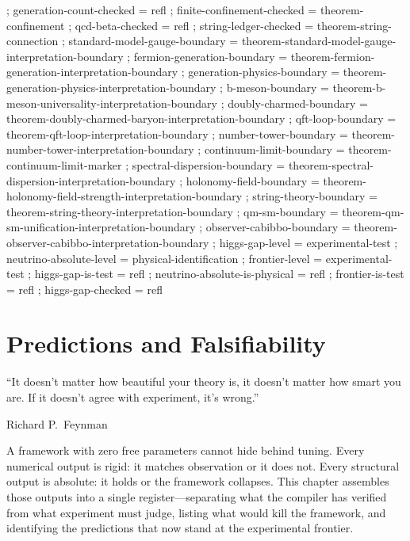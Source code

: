 \documentclass[11pt,a4paper]{book}
\begin{document}
\begin{code}
{  ; generation-count-checked   = refl
  ; finite-confinement-checked = theorem-confinement
  ; qcd-beta-checked           = refl
  ; string-ledger-checked      = theorem-string-connection
  ; standard-model-gauge-boundary = theorem-standard-model-gauge-interpretation-boundary
  ; fermion-generation-boundary = theorem-fermion-generation-interpretation-boundary
  ; generation-physics-boundary = theorem-generation-physics-interpretation-boundary
  ; b-meson-boundary            = theorem-b-meson-universality-interpretation-boundary
  ; doubly-charmed-boundary     = theorem-doubly-charmed-baryon-interpretation-boundary
  ; qft-loop-boundary           = theorem-qft-loop-interpretation-boundary
  ; number-tower-boundary       = theorem-number-tower-interpretation-boundary
  ; continuum-limit-boundary    = theorem-continuum-limit-marker
  ; spectral-dispersion-boundary = theorem-spectral-dispersion-interpretation-boundary
  ; holonomy-field-boundary     = theorem-holonomy-field-strength-interpretation-boundary
  ; string-theory-boundary      = theorem-string-theory-interpretation-boundary
  ; qm-sm-boundary              = theorem-qm-sm-unification-interpretation-boundary
  ; observer-cabibbo-boundary   = theorem-observer-cabibbo-interpretation-boundary
  ; higgs-gap-level            = experimental-test
  ; neutrino-absolute-level    = physical-identification
  ; frontier-level             = experimental-test
  ; higgs-gap-is-test          = refl
  ; neutrino-absolute-is-physical = refl
  ; frontier-is-test           = refl
  ; higgs-gap-checked          = refl }
\end{code}


\chapter{Predictions and Falsifiability}
\label{ch:predictions}

\epigraph{``It doesn't matter how beautiful your theory is, it doesn't matter how smart you are. If it doesn't agree with experiment, it's wrong.''}{Richard P.~Feynman}

A framework with zero free parameters cannot hide behind tuning. Every numerical output is rigid: it matches observation or it does not. Every structural output is absolute: it holds or the framework collapses. This chapter assembles those outputs into a single register---separating what the compiler has verified from what experiment must judge, listing what would kill the framework, and identifying the predictions that now stand at the experimental frontier.
\end{document}
